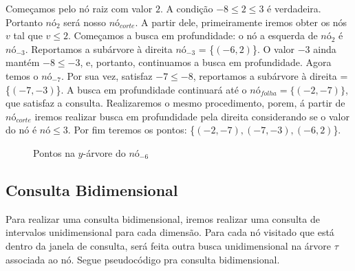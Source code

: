 Começamos pelo nó raiz com valor $2$. A condição $-8 \leq 2 \leq 3$ é verdadeira. Portanto $nó_{2}$
será nosso $nó_{corte}$.
A partir dele, primeiramente iremos obter os nós $v$ tal que $v \leq 2$. Começamos a busca em profundidade:
o nó a esquerda de $nó_{2}$ é $nó_{-3}$. Reportamos a subárvore à direita $nó_{-3}$ = \{$(-6,2)$\}.
O valor $-3$ ainda mantém $-8 \leq -3$, e, portanto, continuamos a busca em profundidade. Agora temos o $nó_{-7}$. Por sua vez, satisfaz  $-7 \leq -8$, reportamos a subárvore à direita =\{$(-7, -3)$\}.
A busca em profundidade continuará até o $nó_{folha}=\{(-2,-7)\}$, que satisfaz a consulta.
Realizaremos o mesmo procedimento, porem, á partir de $nó_{corte}$ iremos realizar busca em profundidade pela direita considerando se o valor do nó é $nó \leq 3$. Por fim teremos os pontos: \{$(-2,-7), (-7,-3), (-6,2)$\}.

\begin{figure}[h]
\centering
{}
\caption{Pontos na $y$-árvore do $nó_{-6}$}
\label{fig:14}
\end{figure}

\subsection{Consulta Bidimensional}

Para realizar uma consulta bidimensional, iremos realizar uma consulta de intervalos unidimensional para
cada dimensão. Para cada nó visitado que está dentro da janela de consulta, será feita outra busca unidimensional
na árvore $\tau$ associada ao nó.
Segue pseudocódigo pra consulta bidimensional.

